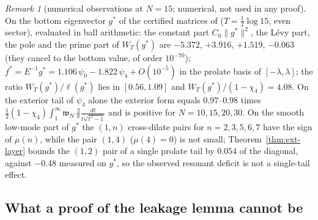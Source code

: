 \documentclass[11pt]{amsart}
\theoremstyle{definition}
\theoremstyle{remark}
\newtheorem{remark}[theorem]{Remark}
\begin{document}
\begin{remark}[numerical observations at $N=15$; numerical, not used in any proof]\label{rem:ext-latnum}
On the bottom eigenvector $g^*$ of the certified matrices of \cite{Mori15} ($T=\frac12\log15$, even sector), evaluated in
ball arithmetic: the constant part $C_0\|g^*\|^2$, the L\'evy part, the pole and the prime part of $W_T(g^*)$ are $-5.372$, $+3.916$, $+1.519$, $-0.063$ (they cancel to the bottom value, of order $10^{-70}$); $f^*=E^{-1}g^*=1.106\,\psi_0-1.822\,\psi_4+O(10^{-5})$ in the prolate basis of $[-\lambda,\lambda]$; the ratio
$W_T(g^*)/\ell(g^*)$ lies in $[0.56,1.09]$ and $W_T(g^*)/(1-\chi_4)=4.08$. On the exterior tail of $\psi_4$ alone the exterior form
equals $0.97$--$0.98$ times $\frac12(1-\chi_4)\int_1^\infty\mathfrak w_N\,\frac{2}{\pi}\frac{dt}{t\sqrt{t^2-1}}$ and is positive for
$N=10,15,20,30$. On the smooth low-mode part of $g^*$ the $(1,n)$ cross-dilate pairs for $n=2,3,5,6,7$ have the sign of $\mu(n)$,
while the pair $(1,4)$ ($\mu(4)=0$) is not small; Theorem~\ref{thm:ext-layer} bounds the $(1,2)$ pair of a single prolate tail by
$0.054$ of the diagonal, against $-0.48$ measured on $g^*$, so the observed resonant deficit is not a single-tail effect.
\end{remark}

\subsection{What a proof of the leakage lemma cannot be}\label{subsec:ext-constraints}
\end{document}
